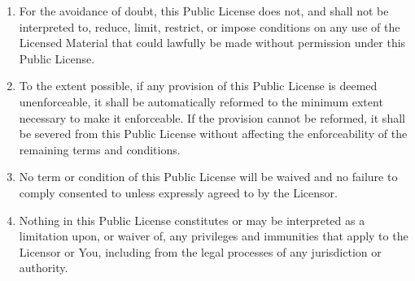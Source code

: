 \begin{enumerate}
\item
  For the avoidance of doubt, this Public License does not, and shall
  not be interpreted to, reduce, limit, restrict, or impose conditions
  on any use of the Licensed Material that could lawfully be made
  without permission under this Public License.
\item
  To the extent possible, if any provision of this Public License is
  deemed unenforceable, it shall be automatically reformed to the
  minimum extent necessary to make it enforceable.
  If the provision
  cannot be reformed, it shall be severed from this Public License
  without affecting the enforceability of the remaining terms and
  conditions.
\item
  No term or condition of this Public License will be waived and no
  failure to comply consented to unless expressly agreed to by the
  Licensor.
\item
  Nothing in this Public License constitutes or may be interpreted as a
  limitation upon, or waiver of, any privileges and immunities that
  apply to the Licensor or You, including from the legal processes of
  any jurisdiction or authority.
\end{enumerate}

